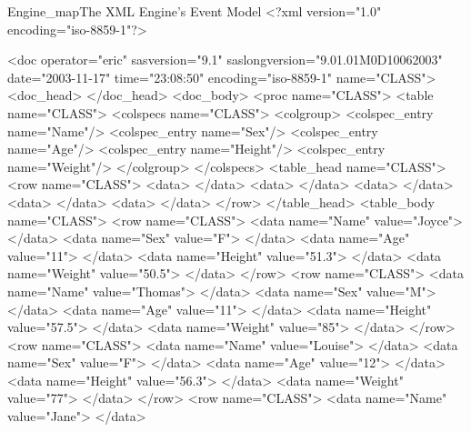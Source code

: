 \begin{fvoutput}{Engine_map}{The XML Engine's Event Model}
<?xml version="1.0" encoding="iso-8859-1"?>

<doc operator="eric" sasversion="9.1" 
      saslongversion="9.01.01M0D10062003" 
      date="2003-11-17" time="23:08:50" 
      encoding="iso-8859-1" name="CLASS">
   <doc_head>
   </doc_head>
   <doc_body>
      <proc name="CLASS">
         <table name="CLASS">
            <colspecs name="CLASS">
               <colgroup>
                  <colspec_entry name="Name"/>
                  <colspec_entry name="Sex"/>
                  <colspec_entry name="Age"/>
                  <colspec_entry name="Height"/>
                  <colspec_entry name="Weight"/>
               </colgroup>
            </colspecs>
            <table_head name="CLASS">
               <row name="CLASS">
                  <data>
                  </data>
                  <data>
                  </data>
                  <data>
                  </data>
                  <data>
                  </data>
                  <data>
                  </data>
               </row>
            </table_head>
            <table_body name="CLASS">
               <row name="CLASS">
                  <data name="Name" value="Joyce">
                  </data>
                  <data name="Sex" value="F">
                  </data>
                  <data name="Age" value="11">
                  </data>
                  <data name="Height" value="51.3">
                  </data>
                  <data name="Weight" value="50.5">
                  </data>
               </row>
               <row name="CLASS">
                  <data name="Name" value="Thomas">
                  </data>
                  <data name="Sex" value="M">
                  </data>
                  <data name="Age" value="11">
                  </data>
                  <data name="Height" value="57.5">
                  </data>
                  <data name="Weight" value="85">
                  </data>
               </row>
               <row name="CLASS">
                  <data name="Name" value="Louise">
                  </data>
                  <data name="Sex" value="F">
                  </data>
                  <data name="Age" value="12">
                  </data>
                  <data name="Height" value="56.3">
                  </data>
                  <data name="Weight" value="77">
                  </data>
               </row>
               <row name="CLASS">
                  <data name="Name" value="Jane">
                  </data>

\end{fvoutput}
